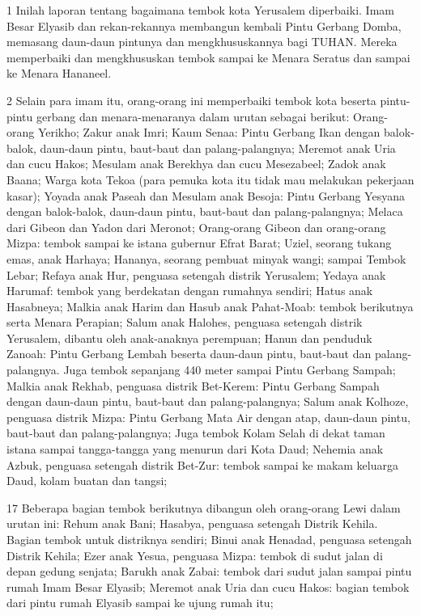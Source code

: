 \par 1 Inilah laporan tentang bagaimana tembok kota Yerusalem diperbaiki. Imam Besar Elyasib dan rekan-rekannya membangun kembali Pintu Gerbang Domba, memasang daun-daun pintunya dan mengkhususkannya bagi TUHAN. Mereka memperbaiki dan mengkhususkan tembok sampai ke Menara Seratus dan sampai ke Menara Hananeel.
\par 2 Selain para imam itu, orang-orang ini memperbaiki tembok kota beserta pintu-pintu gerbang dan menara-menaranya dalam urutan sebagai berikut: Orang-orang Yerikho; Zakur anak Imri; Kaum Senaa: Pintu Gerbang Ikan dengan balok-balok, daun-daun pintu, baut-baut dan palang-palangnya; Meremot anak Uria dan cucu Hakos; Mesulam anak Berekhya dan cucu Mesezabeel; Zadok anak Baana; Warga kota Tekoa (para pemuka kota itu tidak mau melakukan pekerjaan kasar); Yoyada anak Paseah dan Mesulam anak Besoja: Pintu Gerbang Yesyana dengan balok-balok, daun-daun pintu, baut-baut dan palang-palangnya; Melaca dari Gibeon dan Yadon dari Meronot; Orang-orang Gibeon dan orang-orang Mizpa: tembok sampai ke istana gubernur Efrat Barat; Uziel, seorang tukang emas, anak Harhaya; Hananya, seorang pembuat minyak wangi; sampai Tembok Lebar; Refaya anak Hur, penguasa setengah distrik Yerusalem; Yedaya anak Harumaf: tembok yang berdekatan dengan rumahnya sendiri; Hatus anak Hasabneya; Malkia anak Harim dan Hasub anak Pahat-Moab: tembok berikutnya serta Menara Perapian; Salum anak Halohes, penguasa setengah distrik Yerusalem, dibantu oleh anak-anaknya perempuan; Hanun dan penduduk Zanoah: Pintu Gerbang Lembah beserta daun-daun pintu, baut-baut dan palang-palangnya. Juga tembok sepanjang 440 meter sampai Pintu Gerbang Sampah; Malkia anak Rekhab, penguasa distrik Bet-Kerem: Pintu Gerbang Sampah dengan daun-daun pintu, baut-baut dan palang-palangnya; Salum anak Kolhoze, penguasa distrik Mizpa: Pintu Gerbang Mata Air dengan atap, daun-daun pintu, baut-baut dan palang-palangnya; Juga tembok Kolam Selah di dekat taman istana sampai tangga-tangga yang menurun dari Kota Daud; Nehemia anak Azbuk, penguasa setengah distrik Bet-Zur: tembok sampai ke makam keluarga Daud, kolam buatan dan tangsi;
\par 17 Beberapa bagian tembok berikutnya dibangun oleh orang-orang Lewi dalam urutan ini: Rehum anak Bani; Hasabya, penguasa setengah Distrik Kehila. Bagian tembok untuk distriknya sendiri; Binui anak Henadad, penguasa setengah Distrik Kehila; Ezer anak Yesua, penguasa Mizpa: tembok di sudut jalan di depan gedung senjata; Barukh anak Zabai: tembok dari sudut jalan sampai pintu rumah Imam Besar Elyasib; Meremot anak Uria dan cucu Hakos: bagian tembok dari pintu rumah Elyasib sampai ke ujung rumah itu;
